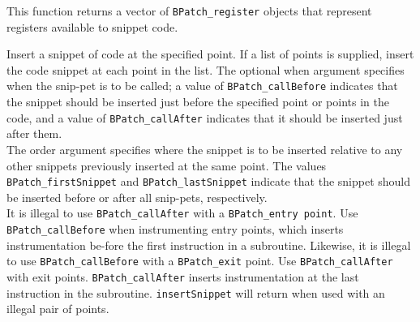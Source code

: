 
{
This function returns a vector of \texttt{BPatch\_register} objects that represent registers available to snippet code.}

{
Insert a snippet of code at the specified point. If a list of points is supplied, insert the code snippet at each point in the list. The optional when argument specifies when the snip-pet is to be called; a value of \texttt{BPatch\_callBefore} indicates that the snippet should be inserted just before the specified point or points in the code, and a value of \texttt{BPatch\_callAfter} indicates that it should be inserted just after them. \\

 The order argument specifies where the snippet is to be inserted relative to any other snippets previously inserted at the same point.  The values \texttt{BPatch\_firstSnippet} and \texttt{BPatch\_lastSnippet} indicate that the snippet should be inserted before or after all snip-pets, respectively.\\
 
It is illegal to use \texttt{BPatch\_callAfter} with a \texttt{BPatch\_entry point}.  Use \texttt{BPatch\_callBefore} when instrumenting entry points, which inserts instrumentation be-fore the first instruction in a subroutine.  Likewise, it is illegal to use \texttt{BPatch\_callBefore} with a \texttt{BPatch\_exit} point.  Use \texttt{BPatch\_callAfter} with exit points. \texttt{BPatch\_callAfter} inserts instrumentation at the last instruction in the subroutine. \texttt{insertSnippet} will return \NULL when used with an illegal pair of points.
}


